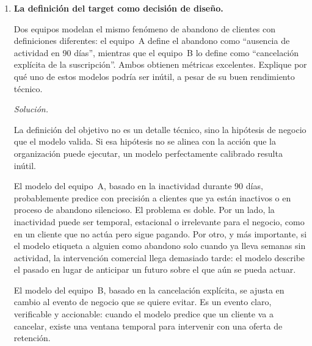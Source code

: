 \documentclass[12pt]{article}
\newcommand\sol[1]{\begin{mdframed}
\emph{Solución.} #1
\end{mdframed}}
\begin{document}
\begin{enumerate}
{\medskip
El objetivo de la persona que diseña el sistema es ajustarlo para encontrar un punto medio estricto: el
programa no debe ser tan básico que pase por alto las reglas importantes, ni tan rebuscado que acabe memorizando
detalles que no importan.

\medskip
Para asegurar que estamos ante un aprendizaje real y no ante pura memorización, el método principal consiste en
ocultar una parte de la información disponible desde el principio. Una parte de los datos se usa para construir
el sistema, y la parte que se mantuvo oculta se guarda exclusivamente para examinarlo al final y verificar que sus
respuestas siguen siendo correctas en un escenario nuevo.
}

\item \textbf{La definición del target como decisión de diseño.}

Dos equipos modelan el mismo fenómeno de abandono de clientes con definiciones diferentes: el equipo~A
define el abandono como ``ausencia de actividad en 90 días'', mientras que el equipo~B lo define como
``cancelación explícita de la suscripción''. Ambos obtienen métricas excelentes. Explique por qué uno
de estos modelos podría ser inútil, a pesar de su buen rendimiento técnico.

\sol{

La definición del objetivo no es un detalle técnico, sino la hipótesis de negocio que el modelo
valida. Si esa hipótesis no se alinea con la acción que la organización puede ejecutar, un modelo
perfectamente calibrado resulta inútil.

\medskip
El modelo del equipo~A, basado en la inactividad durante 90 días, probablemente predice con
precisión a clientes que ya están inactivos o en proceso de abandono silencioso. El problema es doble.
Por un lado, la inactividad puede ser temporal, estacional o irrelevante para el negocio, como en un
cliente que no actúa pero sigue pagando. Por otro, y más importante, si el modelo etiqueta a alguien
como abandono solo cuando ya lleva semanas sin actividad, la intervención comercial llega demasiado
tarde: el modelo describe el pasado en lugar de anticipar un futuro sobre el que aún se pueda actuar.

\medskip
El modelo del equipo~B, basado en la cancelación explícita, se ajusta en cambio al evento de negocio
que se quiere evitar. Es un evento claro, verificable y accionable: cuando el modelo predice que un
cliente va a cancelar, existe una ventana temporal para intervenir con una oferta de retención.

}
\end{enumerate}
\end{document}
